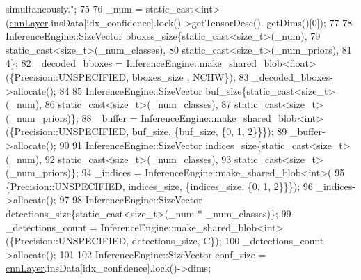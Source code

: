 \begin{DoxyCode}
{       simultaneously."};
75 
76             \_num = \textcolor{keyword}{static\_cast<}\textcolor{keywordtype}{int}\textcolor{keyword}{>}(\hyperlink{classInferenceEngine_1_1Extensions_1_1Cpu_1_1ExtLayerBase_a1074cdccacb9e9ca6eec01bbc2f7ca4a}{cnnLayer}.insData[idx\_confidence].lock()->getTensorDesc().
      getDims()[0]);
77 
78             InferenceEngine::SizeVector bboxes\_size\{\textcolor{keyword}{static\_cast<}\textcolor{keywordtype}{size\_t}\textcolor{keyword}{>}(\_num),
79                                                     static\_cast<size\_t>(\_num\_classes),
80                                                     \textcolor{keyword}{static\_cast<}\textcolor{keywordtype}{size\_t}\textcolor{keyword}{>}(\_num\_priors),
81                                                     4\};
82             \_decoded\_bboxes = InferenceEngine::make\_shared\_blob<float>(\{Precision::UNSPECIFIED, bboxes\_size
      , NCHW\});
83             \_decoded\_bboxes->allocate();
84 
85             InferenceEngine::SizeVector buf\_size\{\textcolor{keyword}{static\_cast<}\textcolor{keywordtype}{size\_t}\textcolor{keyword}{>}(\_num),
86                                                  static\_cast<size\_t>(\_num\_classes),
87                                                  \textcolor{keyword}{static\_cast<}\textcolor{keywordtype}{size\_t}\textcolor{keyword}{>}(\_num\_priors)\};
88             \_buffer = InferenceEngine::make\_shared\_blob<int>(\{Precision::UNSPECIFIED, buf\_size, \{buf\_size, 
      \{0, 1, 2\}\}\});
89             \_buffer->allocate();
90 
91             InferenceEngine::SizeVector indices\_size\{\textcolor{keyword}{static\_cast<}\textcolor{keywordtype}{size\_t}\textcolor{keyword}{>}(\_num),
92                                                      static\_cast<size\_t>(\_num\_classes),
93                                                      \textcolor{keyword}{static\_cast<}\textcolor{keywordtype}{size\_t}\textcolor{keyword}{>}(\_num\_priors)\};
94             \_indices = InferenceEngine::make\_shared\_blob<int>(
95                     \{Precision::UNSPECIFIED, indices\_size, \{indices\_size, \{0, 1, 2\}\}\});
96             \_indices->allocate();
97 
98             InferenceEngine::SizeVector detections\_size\{\textcolor{keyword}{static\_cast<}\textcolor{keywordtype}{size\_t}\textcolor{keyword}{>}(\_num * \_num\_classes)\};
99             \_detections\_count = InferenceEngine::make\_shared\_blob<int>(\{Precision::UNSPECIFIED, 
      detections\_size, C\});
100             \_detections\_count->allocate();
101 
102             InferenceEngine::SizeVector conf\_size = \hyperlink{classInferenceEngine_1_1Extensions_1_1Cpu_1_1ExtLayerBase_a1074cdccacb9e9ca6eec01bbc2f7ca4a}{cnnLayer}.insData[idx\_confidence].lock()->dims;

\end{DoxyCode}
